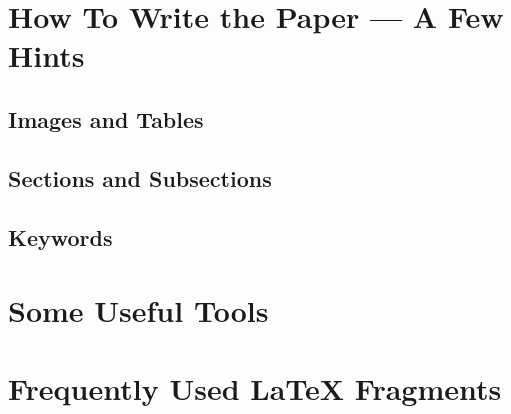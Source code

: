 \section{How To Write the Paper --- A Few Hints}

\subsection{Images and Tables}

\subsection{Sections and Subsections}

\subsection{Keywords}

\section{Some Useful Tools}

\section{Frequently Used \LaTeX{} Fragments}
